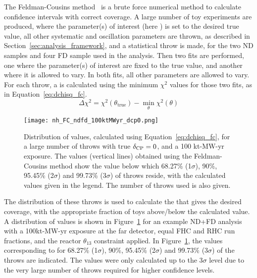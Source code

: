 The Feldman-Cousins method~\cite{Feldman:1997qc} is a brute force numerical method to calculate confidence intervals with correct coverage. A large number of toy experiments are produced, where the parameter(s) of interest (here \deltacp) is set to the desired true value, all other systematic and oscillation parameters are thrown, as described in Section~\ref{sec:analysis_framework}, and a statistical throw is made, for the two ND samples and four FD sample used in the analysis. Then two fits are performed, one where the parameter(s) of interest are fixed to the true value, and another where it is allowed to vary. In both fits, all other parameters are allowed to vary. For each throw, a \dchisq is calculated using the minimum $\chi^{2}$ values for those two fits, as in Equation~\ref{eq:dchisq_fc}.
\begin{equation}
  \Delta\chi^{2} = \chi^{2}(\theta_{\mathrm{true}}) - \min_{\theta}\chi^{2}(\theta)
  \label{eq:dchisq_fc}
\end{equation}
\begin{figure}[htbp]
  \centering
  \texttt{[image: nh\_FC\_ndfd\_100ktMWyr\_dcp0.png]}
  \caption{Distribution of \dchisq values, calculated using Equation~\ref{eq:dchisq_fc}, for a large number of throws with true $\delta_{\rm CP} = 0$, and a 100 kt-MW-yr exposure. The \dchisqcrit values (vertical lines) obtained using the Feldman-Cousins method show the \dchisq value below which 68.27\% (1$\sigma$), 90\%, 95.45\% (2$\sigma$) and 99.73\% (3$\sigma$) of throws reside, with the calculated values given in the legend. The number of throws used is also given.}
  \label{fig:fc_throws}
\end{figure}
The distribution of these throws is used to calculate the \dchisqcrit that gives the desired coverage, with the appropriate fraction of toys above/below the calculated value. A distribution of \dchisq values is shown in Figure~\ref{fig:fc_throws} for an example ND+FD analysis with a 100kt-MW-yr exposure at the far detector, equal FHC and RHC run fractions, and the reactor $\theta_{13}$ constraint applied. In Figure~\ref{fig:fc_throws}, the \dchisqcrit values corresponding to for 68.27\% (1$\sigma$), 90\%, 95.45\% (2$\sigma$) and 99.73\% (3$\sigma$) of the throws are indicated. The \dchisqcrit values were only calculated up to the 3$\sigma$ level due to the very large number of throws required for higher confidence levels.

